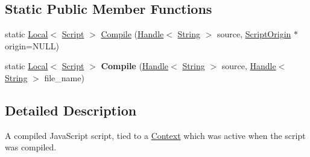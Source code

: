 \subsection*{Static Public Member Functions}
\begin{DoxyCompactItemize}
\item 
static \hyperlink{classv8_1_1Local}{Local}$<$ \hyperlink{classv8_1_1Script}{Script} $>$ \hyperlink{classv8_1_1Script_a78500f4a95d75ffd0253f72a6db750b0}{Compile} (\hyperlink{classv8_1_1Handle}{Handle}$<$ \hyperlink{classv8_1_1String}{String} $>$ source, \hyperlink{classv8_1_1ScriptOrigin}{Script\-Origin} $\ast$origin=N\-U\-L\-L)
\item 
\hypertarget{classv8_1_1Script_ae420c65d6315f3ef8e83e79c17231f4e}{static \hyperlink{classv8_1_1Local}{Local}$<$ \hyperlink{classv8_1_1Script}{Script} $>$ {\bfseries Compile} (\hyperlink{classv8_1_1Handle}{Handle}$<$ \hyperlink{classv8_1_1String}{String} $>$ source, \hyperlink{classv8_1_1Handle}{Handle}$<$ \hyperlink{classv8_1_1String}{String} $>$ file\-\_\-name)}\label{classv8_1_1Script_ae420c65d6315f3ef8e83e79c17231f4e}

\end{DoxyCompactItemize}


\subsection{Detailed Description}
A compiled Java\-Script script, tied to a \hyperlink{classv8_1_1Context}{Context} which was active when the script was compiled. 

